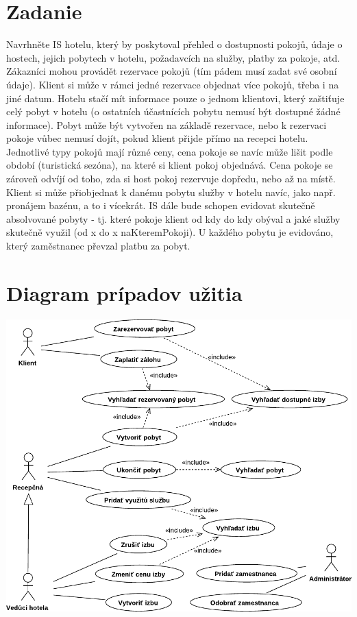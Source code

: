 \documentclass[11pt,a4paper]{article}
\begin{document}

\section*{Zadanie}
Navrhněte IS hotelu, který by poskytoval přehled o dostupnosti pokojů, údaje o hostech, jejich pobytech v hotelu, požadavcích na služby, platby za pokoje, atd. Zákazníci mohou provádět rezervace pokojů (tím pádem musí zadat své osobní údaje). Klient si může v rámci jedné rezervace objednat více pokojů, třeba i na jiné datum. Hotelu stačí mít informace pouze o jednom klientovi, který zaštiťuje celý pobyt v hotelu (o ostatních účastnících pobytu nemusí být dostupné žádné informace). Pobyt může být vytvořen na základě rezervace, nebo k rezervaci pokoje vůbec nemusí dojít, pokud klient přijde přímo na recepci hotelu. Jednotlivé typy pokojů mají různé ceny, cena pokoje se navíc může lišit podle období (turistická sezóna), na které si klient pokoj objednává. Cena pokoje se zároveň odvíjí od toho, zda si host pokoj rezervuje dopředu, nebo až na místě. Klient si může přiobjednat k danému pobytu služby v hotelu navíc, jako např. pronájem bazénu, a to i vícekrát. IS dále bude schopen evidovat skutečně absolvované pobyty - tj. které pokoje klient od kdy do kdy obýval a jaké služby skutečně využil (od x do x naKteremPokoji). U každého pobytu je evidováno, který zaměstnanec převzal platbu za pobyt. 
\section*{Diagram prípadov užitia}
\vfill
\begin{center}
  \includegraphics[width=\linewidth]{src/uc}
\end{center}
\vfill
\newpage
\end{document}
